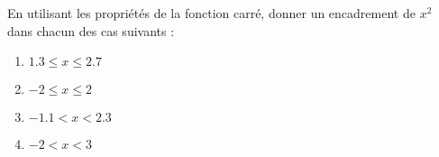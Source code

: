 
\begin{exercice}\label{exosmath-0139}

    En utilisant les propriétés de la fonction carré, donner un encadrement de \( x^2\) dans chacun des cas suivants :
    \begin{multicols}{3}
    \begin{enumerate}
        \item
            \( 1.3\leq x\leq 2.7\)
        \item
            \( -2\leq x\leq 2\)
        \item
            \( -1.1< x<2.3\)
        \item
            \( -2 < x < 3\)
    \end{enumerate}
    \end{multicols}

\end{exercice}
